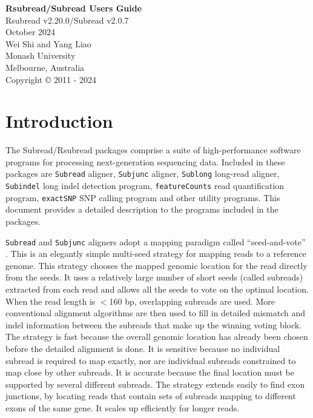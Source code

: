 \documentclass[12pt]{report}
\newcommand{\code}[1]{{\small\texttt{#1}}}
\begin{document}
\begin{titlepage}

\begin{center}
{\Huge\bf Rsubread/Subread Users Guide}\\
\vspace{1 cm}
{\centering\large Rsubread v2.20.0/Subread v2.0.7\\}
\vspace{1 cm}
 October 2024\\
\vspace{5 cm}
\Large Wei Shi and Yang Liao\\
\vspace{1 cm}
\small
{\large Monash University\\
Melbourne, Australia\\}
\vspace{7 cm}
\centering Copyright \small{\copyright}  2011 - 2024\\
\end{center}

\end{titlepage}

\tableofcontents

\chapter{Introduction}

The Subread/Rsubread packages comprise a suite of high-performance software programs for processing next-generation sequencing data.
Included in these packages are \code{Subread} aligner, \code{Subjunc} aligner, \code{Sublong} long-read aligner, \code{Subindel} long indel detection program, \code{featureCounts} read quantification program, \code{exactSNP} SNP calling program and other utility programs.
This document provides a detailed description to the programs included in the packages.

\code{Subread} and \code{Subjunc} aligners adopt a mapping paradigm called ``seed-and-vote'' \cite{liao}.
This is an elegantly simple multi-seed strategy for mapping reads to a reference genome. 
This strategy chooses the mapped genomic location for the read directly from the seeds.
It uses a relatively large number of short seeds (called subreads) extracted from each read and allows all the seeds to vote on the optimal location.
When the read length is $<$160 bp, overlapping subreads are used.
More conventional alignment algorithms are then used to fill in detailed mismatch and indel information between the subreads that make up the winning voting block.
The strategy is fast because the overall genomic location has already been chosen before the detailed alignment is done.
It is sensitive because no individual subread is required to map exactly, nor are individual subreads constrained to map close by other subreads.
It is accurate because the final location must be supported by several different subreads. The strategy extends easily to find exon junctions, by locating reads that contain sets of subreads mapping to different exons of the same gene.
It scales up efficiently for longer reads.
\end{document}
